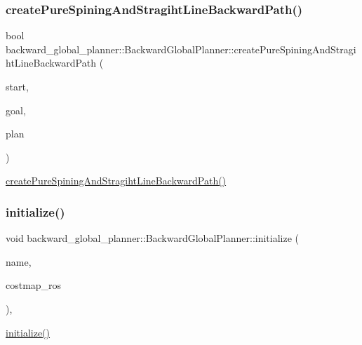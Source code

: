\subsubsection{\texorpdfstring{create\+Pure\+Spining\+And\+Stragiht\+Line\+Backward\+Path()}{createPureSpiningAndStragihtLineBackwardPath()}}
{\footnotesize\ttfamily bool backward\+\_\+global\+\_\+planner\+::\+Backward\+Global\+Planner\+::create\+Pure\+Spining\+And\+Stragiht\+Line\+Backward\+Path (\begin{DoxyParamCaption}\item[{const geometry\+\_\+msgs\+::\+Pose\+Stamped \&}]{start,  }\item[{const geometry\+\_\+msgs\+::\+Pose\+Stamped \&}]{goal,  }\item[{std\+::vector$<$ geometry\+\_\+msgs\+::\+Pose\+Stamped $>$ \&}]{plan }\end{DoxyParamCaption})\hspace{0.3cm}{\ttfamily [virtual]}}

\hyperlink{classbackward__global__planner_1_1BackwardGlobalPlanner_ad0caebe12fdd6cfe66d353bc7b772718}{create\+Pure\+Spining\+And\+Stragiht\+Line\+Backward\+Path()} \mbox{\label{classbackward__global__planner_1_1BackwardGlobalPlanner_ac0dfce1f9ba6d39a3b37ea6c99fac2ae}} 
\subsubsection{\texorpdfstring{initialize()}{initialize()}}
{\footnotesize\ttfamily void backward\+\_\+global\+\_\+planner\+::\+Backward\+Global\+Planner\+::initialize (\begin{DoxyParamCaption}\item[{std\+::string}]{name,  }\item[{costmap\+\_\+2d\+::\+Costmap2\+D\+R\+OS $\ast$}]{costmap\+\_\+ros }\end{DoxyParamCaption})\hspace{0.3cm}{\ttfamily [override]}, {\ttfamily [virtual]}}

\hyperlink{classbackward__global__planner_1_1BackwardGlobalPlanner_ac0dfce1f9ba6d39a3b37ea6c99fac2ae}{initialize()} \mbox{\label{classbackward__global__planner_1_1BackwardGlobalPlanner_a39f2e0d5090f0776942d7cd68eecbde1}} 
